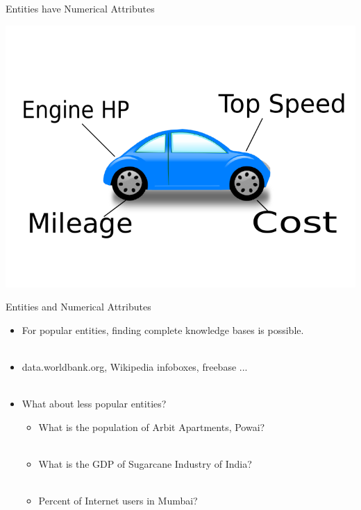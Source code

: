 \documentclass{beamer}
\begin{document}
\begin{frame}{Entities have Numerical Attributes}
 \begin{center}
 \includegraphics[scale=0.45]{images/car.pdf}
\end{center}

\end{frame}

\begin{frame}{Entities and Numerical Attributes}
 
 \begin{itemize}

  \item For popular entities, finding complete knowledge bases is possible. \pause \\~\\
  \item data.worldbank.org, Wikipedia infoboxes, freebase ... \pause \\~\\
  \item What about less popular entities?  \pause 
    \begin{itemize}
      \item What is the population of Arbit Apartments, Powai? \pause \\~\\
      \item What is the GDP of Sugarcane Industry of India? \pause \\~\\
      \item Percent of Internet users in Mumbai? 
    \end{itemize}
 \end{itemize} 
\end{frame}
\end{document}
